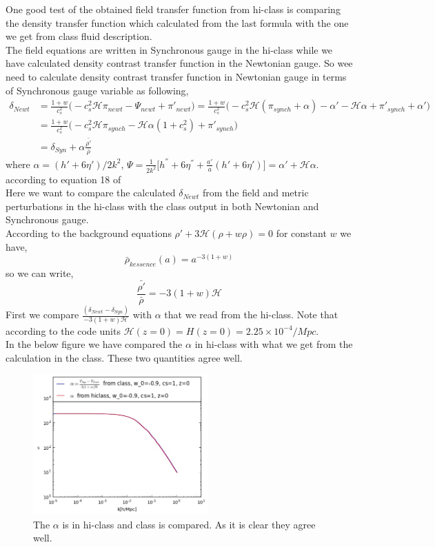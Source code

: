 \documentclass[a4paper,14pt]{article}
\newcommand {\be}{\begin{equation}}
\newcommand {\ee}{\end{equation}}
\begin{document}
One good test of the obtained field transfer function from hi-class is comparing the density transfer function which calculated from the last formula with the one we get from class fluid description.\\
The field equations are written in Synchronous gauge in the hi-class while we have calculated density contrast transfer function in the Newtonian gauge. So wee need to calculate density contrast transfer function in Newtonian gauge in terms of Synchronous gauge variable as following,
\begin{align}
\delta_{Newt}&=\frac{1+w}{c_s^2} \Big (  -c_s^2 \mathcal{H} \pi_{newt}-\Psi_{newt}+\pi'_{newt} \Big )= \frac{1+w}{c_s^2} \Big ( -c_s^2 \mathcal{H} (\pi_{synch} + \alpha)-\alpha ' - \mathcal{H} \alpha+\pi'_{synch} +\alpha' \Big ) \\ \nonumber
&
= \frac{1+w}{c_s^2}\Big (-c_s^2 \mathcal{H} \pi_{synch}- \mathcal{H} \alpha (1+c_s^2)+\pi'_{synch} \Big )
\nonumber \\ 
&
=\delta_{Syn} + \alpha \frac{{\bar{\rho'}}}{\bar{\rho}}
\label{deltaeq}
\end{align}
where $\alpha=({h'} + 6 {\eta'})/2 k^2$, $\Psi=\frac{1}{2 k^2} \Big [ {h^{''}}+ 6 {\eta^{''}} + \frac{a'}{a}  (h'+6 \eta ') \Big]= {\alpha' + \mathcal{H}\alpha.}$  according to equation 18 of  {\color{blue}{https://arxiv.org/pdf/astro-ph/9506072.pdf}} \\
Here we want to compare the calculated $\delta _{Newt}$ from the field and metric perturbations in the hi-class with the class output in both Newtonian and Synchronous gauge.\\ 
According to the background equations ${\rho'} + 3 \mathcal{H} (\rho + w \rho)=0 $ for constant $w$ we have,
\be
\bar{\rho}_{kessence} (a) =a ^{-3(1+w)}
\ee
so we can write,
\be
 \frac{{\bar{\rho'}}}{\bar{\rho}}= -3 (1+w) \mathcal{H}
 \ee
First we compare  $\frac{(\delta_{Newt} - \delta_{Syn})}{-3 (1+w) \mathcal{H}}$ with $\alpha$ that we read from the hi-class. Note that according to the code units $\mathcal{H}(z=0)=H(z=0)=2.25 \times10^{-4} /Mpc $. 
\\
 In the below figure we have compared the $\alpha$ in hi-class with what we get from the calculation in the class. These two quantities agree well.
\begin{figure}[H]
\begin{center}
\captionsetup{,margin=1cm}
\includegraphics[width=0.60\textwidth]{alpha_class} 
\caption{The  $\alpha$ is in hi-class and class is compared. As it is clear they agree well. }
\end{center}
\end{figure}
\end{document}
